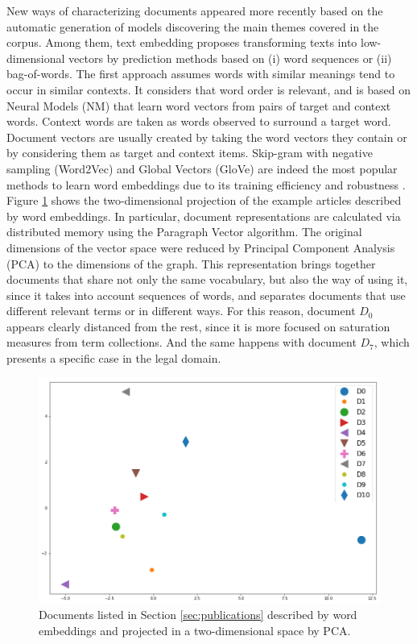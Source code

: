 New ways of characterizing documents appeared more recently based on the automatic generation of models discovering the main themes covered in the corpus. Among them, text embedding proposes transforming texts into low-dimensional vectors by prediction methods based on (i) word sequences or (ii) bag-of-words. The first approach assumes words with similar meanings tend to occur in similar contexts. It considers that word order is relevant, and is based on Neural Models (NM) that learn word vectors from pairs of target and context words. Context words are taken as words observed to surround a target word. Document vectors are usually created by taking the word vectors they contain or by considering them as target and context items. Skip-gram with negative sampling (Word2Vec) \citep{Mikolov2013c} and Global Vectors (GloVe) \citep{pennington2014} are indeed the most popular methods to learn word embeddings due to its training efficiency and robustness \citep{levy2015}. Figure \ref{fig:doc2vec} shows the two-dimensional projection of the example articles described by word embeddings. In particular, document representations are calculated via distributed memory using the Paragraph Vector \citep{LeMikolov2014} algorithm. The original dimensions of the vector space were reduced by Principal Component Analysis (PCA) to the dimensions of the graph. This representation brings together documents that share not only the same vocabulary, but also the way of using it, since it takes into account sequences of words, and separates documents that use different relevant terms or in different ways. For this reason, document $D_0$ appears clearly distanced from the rest, since it is more focused on saturation measures from term collections. And the same happens with document $D_7$, which presents a specific case in the legal domain.



\begin{figure}[!htbp]
\centering
\includegraphics[scale=0.34]{doc2vec.png}
\caption{Documents listed in Section \ref{sec:publications} described by word embeddings and projected in a two-dimensional space by PCA. }
\label{fig:doc2vec}
\end{figure}


